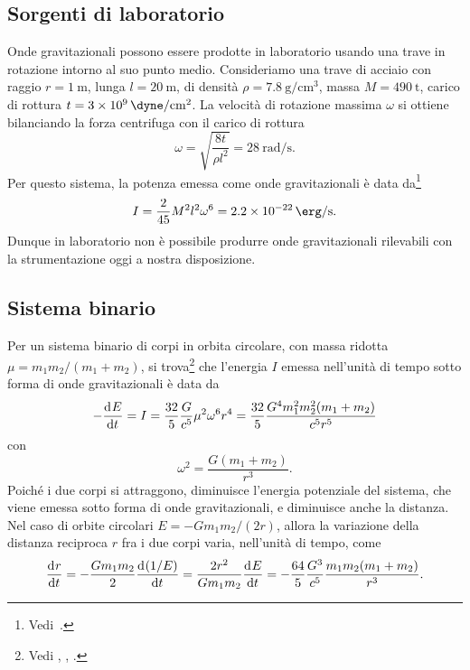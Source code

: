 \subsection{Sorgenti di laboratorio}
\label{sec:sorgenti-laboratorio}

Onde gravitazionali possono essere prodotte in laboratorio usando una trave in
rotazione intorno al suo punto medio.  Consideriamo una trave di acciaio con
raggio $r = \SI{1}{\metre}$, lunga $l = \SI{20}{\metre}$, di densità
$\rho = \SI{7.8}{\gram\per\centi\metre\cubed}$, massa $M = \SI{490}{\tonne}$,
carico di rottura $t = \SI{3e9}{\dyne\per\centi\metre\squared}$.  La velocità di
rotazione massima $\omega$ si ottiene bilanciando la forza centrifuga con il
carico di rottura
\begin{equation}
  \omega = \sqrt{\frac{8t}{\rho l^{2}}} = \SI{28}{\radian\per\second}.
\end{equation}
Per questo sistema, la potenza emessa come onde gravitazionali è data
da\footnote{Vedi~\textcite[980]{misner:gravitation}.}
\begin{equation}
  I = \frac{2}{45} M^{2} l^{2} \omega^{6} = \SI{2.2e-22}{\erg\per\second}.
\end{equation}
Dunque in laboratorio non è possibile produrre onde gravitazionali rilevabili
con la strumentazione oggi a nostra disposizione.

\subsection{Sistema binario}
\label{sec:sistema-binario}

Per un sistema binario di corpi in orbita circolare, con massa ridotta
$\mu = m_{1}m_{2}/(m_{1} + m_{2})$, si
trova\footnote{Vedi \textcite[461]{landau:campi},
  \textcite[986]{misner:gravitation}, \textcite[476]{shapiro:black-holes}.}
che l'energia $I$ emessa nell'unità di tempo sotto forma di onde gravitazionali
è data da
\begin{equation}
  \label{eq:potenza-onde-sistema-binario}
  -\frac{{\mathop{}\!\mathrm{d}^{}}E}{\mathop{}\!\mathrm{d} {t}^{}} = I = \frac{32}{5} \frac{G}{c^{5}} \mu^{2} \omega^{6} r^{4} =
  \frac{32}{5} \frac{G^{4} m_{1}^{2} m_{2}^{2} (m_{1} + m_{2})}{c^{5}r^{5}}
\end{equation}
con
\begin{equation}
  \omega^{2} = \frac{G(m_{1} + m_{2})}{r^{3}}.
\end{equation}
Poiché i due corpi si attraggono, diminuisce l'energia potenziale del sistema,
che viene emessa sotto forma di onde gravitazionali, e diminuisce anche la
distanza.  Nel caso di orbite circolari $E = -Gm_{1}m_{2}/(2r)$, allora la
variazione della distanza reciproca $r$ fra i due corpi varia, nell'unità di
tempo, come
\begin{equation}
  \frac{{\mathop{}\!\mathrm{d}^{}}r}{\mathop{}\!\mathrm{d} {t}^{}} = -\frac{Gm_{1}m_{2}}{2} \frac{{\mathop{}\!\mathrm{d}^{}}(1/E)}{\mathop{}\!\mathrm{d} {t}^{}} =
  \frac{2r^{2}}{Gm_{1}m_{2}} \frac{{\mathop{}\!\mathrm{d}^{}}E}{\mathop{}\!\mathrm{d} {t}^{}} = -\frac{64}{5}\frac{G^{3}}{c^{5}}
  \frac{m_{1}m_{2}(m_{1} + m_{2})}{r^{3}}.
\end{equation}

